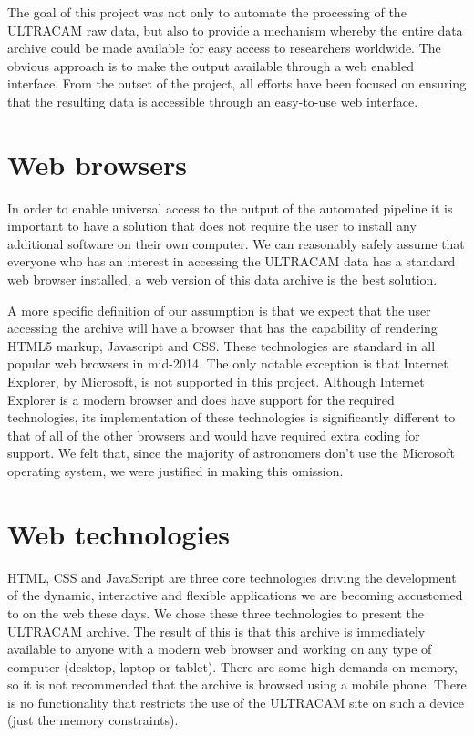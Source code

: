 The goal of this project was not only to automate the processing of the ULTRACAM raw data, but also to provide a mechanism whereby the entire data archive could be made available for easy access to researchers worldwide. The obvious approach is to make the output available through a web enabled interface. From the outset of the project, all efforts have been focused on ensuring that the resulting data is accessible through an easy-to-use web interface. 

\section{Web browsers}
In order to enable universal access to the output of the automated pipeline it is important to have a solution that does not require the user to install any additional software on their own computer. We can reasonably safely assume that everyone who has an interest in accessing the ULTRACAM data has a standard web browser installed, a web version of this data archive is the best solution. 

A more specific definition of our assumption is that we expect that the user accessing the archive will have a browser that has the capability of rendering HTML5 markup, Javascript and CSS. These technologies are standard in all popular web browsers in mid-2014. The only notable exception is that Internet Explorer, by Microsoft, is not supported in this project. Although Internet Explorer is a modern browser and does have support for the required technologies, its implementation of these technologies is significantly different to that of all of the other browsers and would have required extra coding for support. We felt that, since the majority of astronomers don't use the Microsoft operating system, we were justified in making this omission.  

\section{Web technologies}
HTML, CSS and JavaScript are three core technologies driving the development of the dynamic, interactive and flexible applications we are becoming accustomed to on the web these days. We chose these three technologies to present the ULTRACAM archive. The result of this is that this archive is immediately available to anyone with a modern web browser and working on any type of computer (desktop, laptop or tablet). There are some high demands on memory, so it is not recommended that the archive is browsed using a mobile phone. There is no functionality that restricts the use of the ULTRACAM site on such a device (just the memory constraints). 


